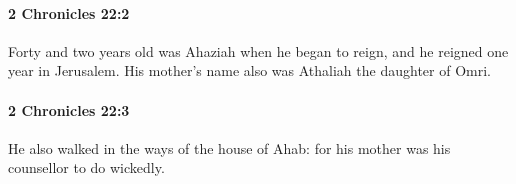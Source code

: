 		\paragraph{2 Chronicles 22:2} %
			\label{2CHRONICLES-22-2}

			Forty and two years old was Ahaziah when he began to reign, and he reigned one year in Jerusalem. His mother's name also was Athaliah the daughter of Omri.


		\paragraph{2 Chronicles 22:3} %
			\label{2CHRONICLES-22-3}

			He also walked in the ways of the house of Ahab: for his mother was his counsellor to do wickedly.


